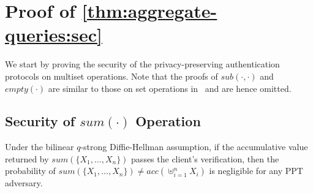 \chapter{Proof of \texorpdfstring{\cref*{thm:aggregate-queries:sec}}{Theorem~\ref{thm:aggregate-queries:sec}}}%
\label{app:aggregate-queries}

We start by proving the security of the privacy-preserving authentication protocols on multiset operations. Note that the proofs of $sub(\cdot, \cdot)$ and $empty(\cdot)$ are similar to those on set operations in~\cite{10.1007/978-3-642-22792-9_6} and are hence omitted.

\section{Security of $sum(\cdot)$ Operation}

\begin{lemma}\label{lem:aggregate-queries:sum}
  Under the bilinear $q$-strong Diffie-Hellman assumption, if the accumulative value returned by $sum(\{X_1,\dots,X_n\})$ passes the client's verification, then the probability of $sum(\{X_1,\dots,X_n\}) \neq acc(\uplus_{i=1}^n X_i)$ is negligible for any PPT adversary.
\end{lemma}

